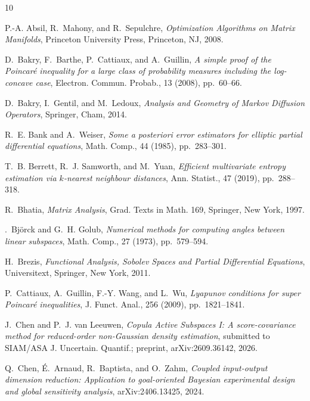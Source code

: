 \begin{thebibliography}{10}

{\sc P.-A. Absil, R.~Mahony, and R.~Sepulchre}, {\em Optimization Algorithms on Matrix Manifolds}, Princeton University Press, Princeton, NJ, 2008.

{\sc D.~Bakry, F.~Barthe, P.~Cattiaux, and A.~Guillin}, {\em A simple proof of the {P}oincar\'e inequality for a large class of probability measures including the log-concave case}, Electron. Commun. Probab., 13 (2008), pp.~60--66.

{\sc D.~Bakry, I.~Gentil, and M.~Ledoux}, {\em Analysis and Geometry of Markov Diffusion Operators}, Springer, Cham, 2014.

{\sc R.~E. Bank and A.~Weiser}, {\em Some a posteriori error estimators for elliptic partial differential equations}, Math. Comp., 44 (1985), pp.~283--301.

{\sc T.~B. Berrett, R.~J. Samworth, and M.~Yuan}, {\em Efficient multivariate entropy estimation via $k$-nearest neighbour distances}, Ann. Statist., 47 (2019), pp.~288--318.

{\sc R.~Bhatia}, {\em Matrix Analysis}, Grad. Texts in Math. 169, Springer, New York, 1997.

{\sc {\AA}.~Bj{\"o}rck and G.~H. Golub}, {\em Numerical methods for computing angles between linear subspaces}, Math. Comp., 27 (1973), pp.~579--594.

{\sc H.~Brezis}, {\em Functional Analysis, Sobolev Spaces and Partial Differential Equations}, Universitext, Springer, New York, 2011.

{\sc P.~Cattiaux, A.~Guillin, F.-Y. Wang, and L.~Wu}, {\em Lyapunov conditions for super {P}oincar\'e inequalities}, J. Funct. Anal., 256 (2009), pp.~1821--1841.

{\sc J.~Chen and P.~J. van Leeuwen}, {\em Copula Active Subspaces I: A score-covariance method for reduced-order non-{G}aussian density estimation}, submitted to SIAM/ASA J. Uncertain. Quantif.; preprint, arXiv:2609.36142, 2026.

{\sc Q.~Chen, \'E.~Arnaud, R.~Baptista, and O.~Zahm}, {\em Coupled input-output dimension reduction: Application to goal-oriented {B}ayesian experimental design and global sensitivity analysis}, arXiv:2406.13425, 2024.


\end{thebibliography}
